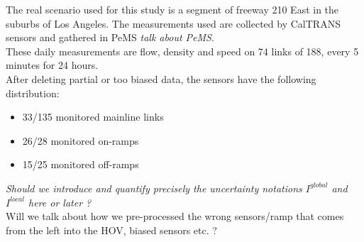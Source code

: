 The real scenario used for this study is a segment of freeway 210 East in the suburbs of Los Angeles. The measurements used are collected by CalTRANS sensors and gathered in PeMS \emph{talk about PeMS}. \\
These daily measurements are flow, density and speed on 74 links of 188, every 5 minutes for 24 hours.\\
After deleting partial or too biased data, the sensors have the following distribution:
\begin{itemize}
	\item 33/135 monitored mainline links
	\item 26/28 monitored on-ramps
	\item 15/25 monitored off-ramps
\end{itemize}
\emph{Should we introduce and quantify  precisely the uncertainty notations $I^{global}$ and $I^{local}$ here or later ?}\\
\color{red}Will we talk about how we pre-processed the wrong sensors/ramp that comes from the left into the HOV, biased sensors etc. ?\color{black}

